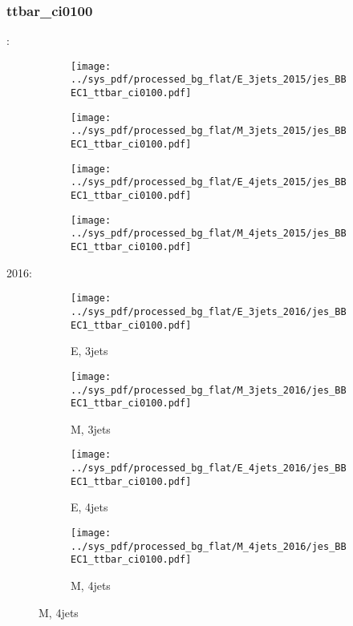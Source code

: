 \documentclass{beamer}
\begin{document}
\begin{frame}
\frametitle{ttbar_ci0100}
\fontsize{5}{1}:
\begin{figure}
\centering
\begin{subfigure}[b]{0.24\textwidth}
\texttt{[image: ../sys\_pdf/processed\_bg\_flat/E\_3jets\_2015/jes\_BBEC1\_ttbar\_ci0100.pdf]}
\end{subfigure}
\begin{subfigure}[b]{0.24\textwidth}
\texttt{[image: ../sys\_pdf/processed\_bg\_flat/M\_3jets\_2015/jes\_BBEC1\_ttbar\_ci0100.pdf]}
\end{subfigure}
\begin{subfigure}[b]{0.24\textwidth}
\texttt{[image: ../sys\_pdf/processed\_bg\_flat/E\_4jets\_2015/jes\_BBEC1\_ttbar\_ci0100.pdf]}
\end{subfigure}
\begin{subfigure}[b]{0.24\textwidth}
\texttt{[image: ../sys\_pdf/processed\_bg\_flat/M\_4jets\_2015/jes\_BBEC1\_ttbar\_ci0100.pdf]}
\end{subfigure}
\end{figure}
2016:
\begin{figure}
\centering
\begin{subfigure}[b]{0.24\textwidth}
\texttt{[image: ../sys\_pdf/processed\_bg\_flat/E\_3jets\_2016/jes\_BBEC1\_ttbar\_ci0100.pdf]}
\captionsetup{font=tiny}
\caption{E, 3jets}
\end{subfigure}
\begin{subfigure}[b]{0.24\textwidth}
\texttt{[image: ../sys\_pdf/processed\_bg\_flat/M\_3jets\_2016/jes\_BBEC1\_ttbar\_ci0100.pdf]}
\captionsetup{font=tiny}
\caption{M, 3jets}
\end{subfigure}
\begin{subfigure}[b]{0.24\textwidth}
\texttt{[image: ../sys\_pdf/processed\_bg\_flat/E\_4jets\_2016/jes\_BBEC1\_ttbar\_ci0100.pdf]}
\captionsetup{font=tiny}
\caption{E, 4jets}
\end{subfigure}
\begin{subfigure}[b]{0.24\textwidth}
\texttt{[image: ../sys\_pdf/processed\_bg\_flat/M\_4jets\_2016/jes\_BBEC1\_ttbar\_ci0100.pdf]}
\captionsetup{font=tiny}
\caption{M, 4jets}
\end{subfigure}
\end{figure}
\end{frame}
\end{document}
